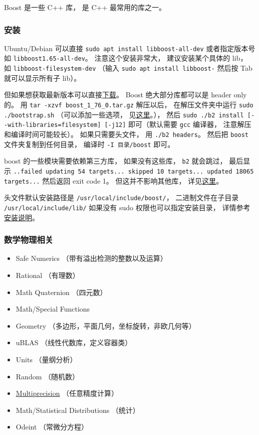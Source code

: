 

Boost 是一些 C++ 库， 是 C++ 最常用的库之一。

\subsubsection{安装}
Ubuntu/Debian 可以直接 \verb|sudo apt install libboost-all-dev| 或者指定版本号如 \verb|libboost1.65-all-dev|。 注意这个安装非常大， 建议安装某个具体的 lib， 如 \verb|libboost-filesystem-dev| （输入 \verb|sudo apt install libboost-| 然后按 Tab 就可以显示所有子 lib）。

但如果想获取最新版本可以直接\href{https://www.boost.org/users/history/version_1_76_0.html}{下载}。 Boost 绝大部分库都可以是 header only 的。 用 \verb|tar -xzvf boost_1_76_0.tar.gz| 解压以后， 在解压文件夹中运行 \verb|sudo ./bootstrap.sh| （可以添加一些选项， 见\href{https://www.boost.org/doc/libs/1_66_0/more/getting_started/unix-variants.html#easy-build-and-install}{这里}。）， 然后 \verb|sudo ./b2 install [--with-libraries=filesystem] [-j12]| 即可（默认需要 \verb|gcc| 编译器， 注意解压和编译时间可能较长）。 如果只需要头文件， 用 \verb|./b2 headers|。 然后把 \verb|boost| 文件夹复制到任何目录， 编译时 \verb|-I 目录/boost| 即可。

boost 的一些模块需要依赖第三方库， 如果没有这些库， \verb|b2| 就会跳过， 最后显示 \verb|..failed updating 54 targets... skipped 10 targets... updated 18065 targets...| 然后返回 exit code 1。 但这并不影响其他库， 详见\href{https://stackoverflow.com/questions/12906829/failed-updating-58-targets-when-trying-to-build-boost-what-happened}{这里}。

头文件默认安装路径是 \verb|/usr/local/include/boost/|， 二进制文件在子目录 \verb|/usr/local/include/lib/| 如果没有 sudo 权限也可以指定安装目录， 详情参考\href{https://www.boost.org/doc/libs/1_76_0/more/getting_started/unix-variants.html#easy-build-and-install}{安装说明}。

\subsubsection{数学物理相关}
\begin{itemize}
\item Safe Numerics （带有溢出检测的整数以及运算）
\item Rational （有理数）
\item Math Quaternion （四元数）
\item Math/Special Functions
\item Geometry （多边形，平面几何，坐标旋转，非欧几何等）
\item uBLAS （线性代数库，定义容器类）
\item Units （量纲分析）
\item Random （随机数）
\item \href{https://www.boost.org/doc/libs/1_72_0/libs/multiprecision/doc/html/index.html}{Multiprecision} （任意精度计算）
\item Math/Statistical Distributions （统计）
\item Odeint （常微分方程）
\end{itemize}

